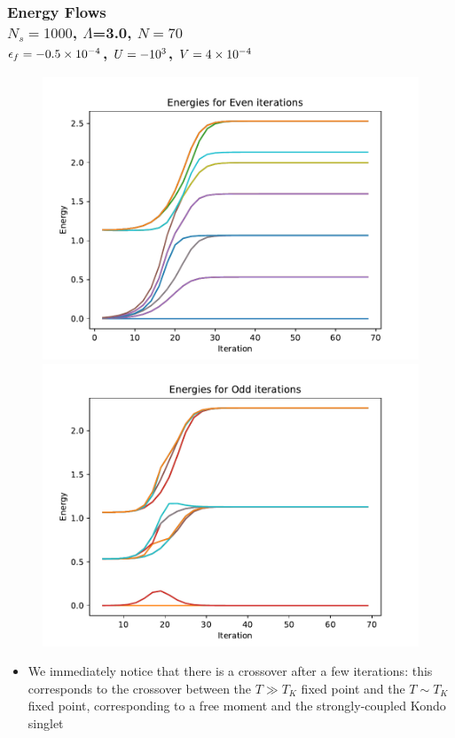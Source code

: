 \documentclass{beamer}
\begin{document}
\begin{frame}
  \frametitle{Energy Flows \\ $N_s=1000$, $\Lambda$=3.0, $N=70$ \\ $\epsilon_f=\num{-0.5d-4}$, $U=\num{-e3}$, $V=\num{4d-4}$}

  \begin{figure}
    \centering
    \includegraphics[width=0.49\linewidth]{./gfx/even_lowU.pdf}
    \includegraphics[width=0.49\linewidth]{./gfx/odd_lowU.pdf}
  \end{figure}

  \begin{itemize}
  \item We immediately notice that there is a crossover after a few iterations: this corresponds to the crossover between the $T \gg T_K$ fixed point and the $T \sim T_K$ fixed point, corresponding to a free moment and the strongly-coupled Kondo singlet
  \end{itemize}
\end{frame}
\end{document}

